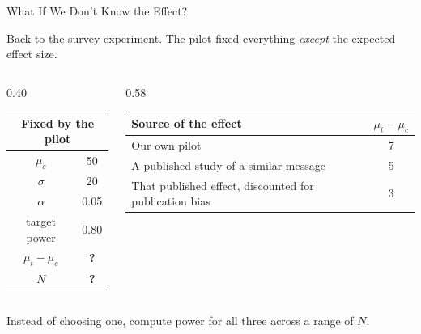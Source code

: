 \documentclass[
  ignorenonframetext,
  aspectratio=169,
]{beamer}
\begin{document}
\begin{frame}{What If We Don't Know the Effect?}
\label{what-if-we-dont-know-the-effect}
\vspace{0.2em}

\small Back to the survey experiment. The pilot fixed everything
\textit{except} the expected effect size.

\vspace{0.5em}

\begin{columns}[T]

\begin{column}{0.40\textwidth}
\begin{center}
\footnotesize
\setlength{\tabcolsep}{6pt}
\renewcommand{\arraystretch}{1.25}
\begin{tabular}{cc}
\toprule
\multicolumn{2}{c}{\textbf{Fixed by the pilot}} \\
\midrule
$\mu_c$        & 50   \\
$\sigma$       & 20   \\
$\alpha$       & 0.05 \\
target power & 0.80 \\
\midrule
$\mu_t - \mu_c$ & \textcolor{statorange}{\textbf{?}} \\
$N$             & \textcolor{statorange}{\textbf{?}} \\
\bottomrule
\end{tabular}
\end{center}
\end{column}

\begin{column}{0.58\textwidth}
\begin{center}
\footnotesize
\setlength{\tabcolsep}{6pt}
\renewcommand{\arraystretch}{1.25}
\begin{tabular}{>{\raggedright\arraybackslash}p{5.6cm}c}
\toprule
\textbf{Source of the effect} & $\mu_t - \mu_c$ \\
\midrule
Our own pilot                          & 7 \\
A published study of a similar message & 5 \\
That published effect, discounted for publication bias & 3 \\
\bottomrule
\end{tabular}
\end{center}
\end{column}

\end{columns}

\vspace{0.6em}

\begin{center}
\small Instead of choosing one, compute power for all three across a range of $N$.
\end{center}
\end{frame}
\end{document}
